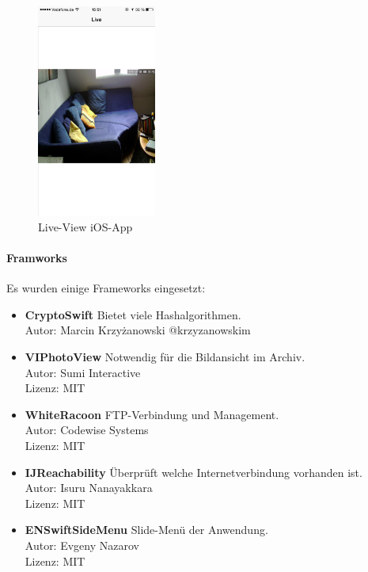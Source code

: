 \begin{figure}
	\vspace{-20pt}
	\begin{center}
		\includegraphics[width=0.35\textwidth]{./data/live.png}
	\end{center}
	\vspace{-20pt}
	\caption{\label{fig:image-live}Live-View iOS-App}
	\vspace{-10pt}
\end{figure} 




\paragraph{Framworks} Es wurden einige Frameworks eingesetzt:
\begin{itemize}
	\item \textbf{CryptoSwift}\cite{cryptoswift} Bietet viele Hashalgorithmen. \\ Autor: Marcin Krzyżanowski @krzyzanowskim
	\item \textbf{VIPhotoView}\cite{viphotoview} Notwendig für die Bildansicht im Archiv. \\ Autor: Sumi Interactive \\ Lizenz: MIT
	\item \textbf{WhiteRacoon}\cite{viphotoview} FTP-Verbindung und Management. \\ Autor: Codewise Systems \\ Lizenz: MIT
	\item \textbf{IJReachability}\cite{ijreachability} Überprüft welche Internetverbindung vorhanden ist. \\ Autor: Isuru Nanayakkara \\ Lizenz: MIT
	\item \textbf{ENSwiftSideMenu}\cite{enswiftsidemenu} Slide-Menü der Anwendung. \\ Autor: Evgeny Nazarov \\ Lizenz: MIT
\end{itemize}


